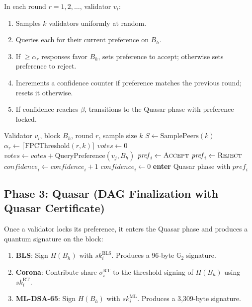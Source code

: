 In each round $r = 1, 2, \ldots$, validator $v_i$:
\begin{enumerate}[leftmargin=2em]
\item Samples $k$ validators uniformly at random.
\item Queries each for their current preference on $B_h$.
\item If $\geq \alpha_r$ responses favor $B_h$, sets preference to accept;
      otherwise sets preference to reject.
\item Increments a confidence counter if preference matches the previous round;
      resets it otherwise.
\item If confidence reaches $\beta$, transitions to the Quasar phase with
      preference locked.
\end{enumerate}

\begin{algorithm}
\caption{Wave: FPC voting round}
\label{alg:wave}
\begin{algorithmic}[1]
\Require Validator $v_i$, block $B_h$, round $r$, sample size $k$
\State $S \gets \text{SamplePeers}(k)$
\State $\alpha_r \gets \lceil \text{FPCThreshold}(r, k) \rceil$
\State $\mathit{votes} \gets 0$
    \State $\mathit{votes} \gets \mathit{votes} + \text{QueryPreference}(v_j, B_h)$
\EndFor
{}
    \State $\mathit{pref}_i \gets \textsc{Accept}$
\Else
    \State $\mathit{pref}_i \gets \textsc{Reject}$
\EndIf
{}
    \State $\mathit{confidence}_i \gets \mathit{confidence}_i + 1$
\Else
    \State $\mathit{confidence}_i \gets 0$
\EndIf
{}
    \State \textbf{enter} Quasar phase with $\mathit{pref}_i$
\EndIf
\end{algorithmic}
\end{algorithm}

\subsection{Phase 3: Quasar (DAG Finalization with Quasar Certificate)}

Once a validator locks its preference, it enters the Quasar phase and produces
a quantum signature on the block:

\begin{enumerate}[leftmargin=2em]
\item \textbf{BLS}: Sign $H(B_h)$ with $\mathit{sk}_i^{\mathrm{BLS}}$.
      Produces a 96-byte $\mathbb{G}_2$ signature.
\item \textbf{Corona}: Contribute share $\sigma_i^{\mathrm{RT}}$ to the
      threshold signing of $H(B_h)$ using $\mathit{sk}_i^{\mathrm{RT}}$.
\item \textbf{ML-DSA-65}: Sign $H(B_h)$ with $\mathit{sk}_i^{\mathrm{ML}}$.
      Produces a 3{,}309-byte signature.
\end{enumerate}

